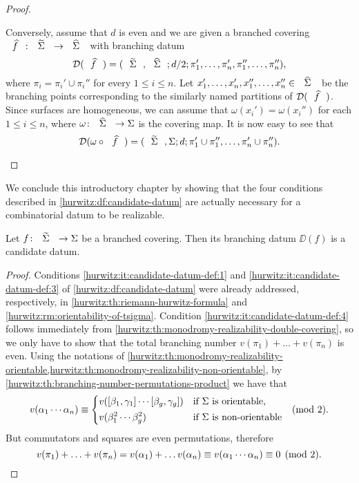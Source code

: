 \begin{proof}
\begin{twoimplications}
\leftimplication
Conversely, assume that $d$ is even and we are given a branched covering $\map{\what{f}}{\tSigma}{\hSigma}$ with branching datum
\[
\DD(\what{f})=\datum{\tSigma,\hSigma}{d/2}{\pi_1',\ldots,\pi_n',\pi_1'',\ldots,\pi_n''},
\]
where $\pi_i=\pi_i'\cup\pi_i''$ for every $1\le i\le n$. Let $x_1',\ldots,x_n',x_1'',\ldots,x_n''\in\hSigma$ be the branching points corresponding to the similarly named partitions of $\DD(\what{f})$. Since surfaces are homogeneous, we can assume that $\omega(x_i')=\omega(x_i'')$ for each $1\le i\le n$, where $\map{\omega}{\hSigma}{\Sigma}$ is the covering map. It is now easy to see that
\[
\DD(\omega\circ\what{f})=\datum{\tSigma,\Sigma}{d}{\pi_1'\cup\pi_1'',\ldots,\pi_n'\cup\pi_n''}.\qedhere
\]
\end{twoimplications}
\end{proof}

We conclude this introductory chapter by showing that the four conditions described in \cref{hurwitz:df:candidate-datum} are actually necessary for a combinatorial datum to be realizable.

\begin{proposition}\label{hurwitz:th:candidate-datum-necessary-conditions}
Let $\map{f}{\tSigma}{\Sigma}$ be a branched covering. Then its branching datum $\DD(f)$ is a candidate datum.
\end{proposition}
\begin{proof}
Conditions \ref{hurwitz:it:candidate-datum-def:1} and \ref{hurwitz:it:candidate-datum-def:3} of \cref{hurwitz:df:candidate-datum} were already addressed, respectively, in \cref{hurwitz:th:riemann-hurwitz-formula} and \cref{hurwitz:rm:orientability-of-tsigma}. Condition \ref{hurwitz:it:candidate-datum-def:4} follows immediately from \cref{hurwitz:th:monodromy-realizability-double-covering}, so we only have to show that the total branching number $v(\pi_1)+\ldots+v(\pi_n)$ is even. Using the notations of \cref{hurwitz:th:monodromy-realizability-orientable,hurwitz:th:monodromy-realizability-non-orientable}, by \cref{hurwitz:th:branching-number-permutations-product} we have that
\[
v(\alpha_1\cdots\alpha_n)\equiv
\begin{dcases*}
v([\beta_1,\gamma_1]\cdots[\beta_g,\gamma_g])&if $\Sigma$ is orientable,\\
v(\beta_1^2\cdots\beta_g^2)&if $\Sigma$ is non-orientable
\end{dcases*}
\pmod{2}.
\]
But commutators and squares are even permutations, therefore
\[
v(\pi_1)+\ldots+v(\pi_n)=v(\alpha_1)+\ldots v(\alpha_n)\equiv v(\alpha_1\cdots\alpha_n)\equiv 0\pmod{2}.\qedhere
\]
\end{proof}
